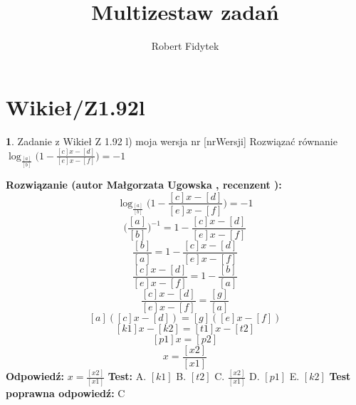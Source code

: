 \documentclass[12pt, a4paper]{article}
\title{Multizestaw zadań}
\author{Robert Fidytek}
\date{}
\theoremstyle{definition} %
\newtheorem{zad}{}
\newcommand{\kategoria}[1]{\section{#1}} %
\newcommand{\zadStart}[1]{\begin{zad}#1\newline} %
\newcommand{\zadStop}{\end{zad}}   %
\newcommand{\rozwStart}[2]{\noindent \textbf{Rozwiązanie (autor #1 , recenzent #2): }\newline} %
\newcommand{\rozwStop}{\newline}                                            %
\newcommand{\odpStart}{\noindent \textbf{Odpowiedź:}\newline}    %
\newcommand{\odpStop}{\newline}                                             %
\newcommand{\testStart}{\noindent \textbf{Test:}\newline} %
\newcommand{\testStop}{\newline} %
\newcommand{\kluczStart}{\noindent \textbf{Test poprawna odpowiedź:}\newline} %
\newcommand{\kluczStop}{\newline} %
\begin{document}
\maketitle


\kategoria{Wikieł/Z1.92l}
\zadStart{Zadanie z Wikieł Z 1.92 l) moja wersja nr [nrWersji]}
Rozwiązać równanie $\log_{\frac{[a]}{[b]}}{\Big(1-\frac{[c]x-[d]}{[e]x-[f]}\Big)}=-1$
\zadStop
\rozwStart{Małgorzata Ugowska}{}
$$\log_{\frac{[a]}{[b]}}{\Big(1-\frac{[c]x-[d]}{[e]x-[f]}\Big)}=-1 $$
$$ \Big(\frac{[a]}{[b]}\Big)^{-1}= 1-\frac{[c]x-[d]}{[e]x-[f]} $$
$$ \frac{[b]}{[a]} = 1-\frac{[c]x-[d]}{[e]x-[f]} $$
$$ \frac{[c]x-[d]}{[e]x-[f]} =1-\frac{[b]}{[a]} $$
$$ \frac{[c]x-[d]}{[e]x-[f]} =\frac{[g]}{[a]} $$
$$ [a]([c]x-[d])=[g]([e]x-[f])$$
$$ [k1]x-[k2]=[t1]x-[t2] $$
$$ [p1]x=[p2] $$
$$ x=\frac{[x2]}{[x1]}$$
\rozwStop
\odpStart
$x=\frac{[x2]}{[x1]}$
\odpStop
\testStart
A. $[k1]$
B. $[t2]$
C. $\frac{[x2]}{[x1]}$
D. $[p1]$
E. $[k2]$
\testStop
\kluczStart
C
\kluczStop
\end{document}
